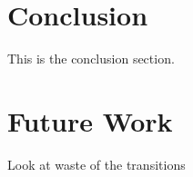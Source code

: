 \section{Conclusion}
This is the conclusion section.

\section{Future Work}
Look at waste of the transitions
